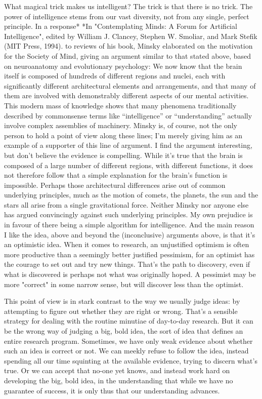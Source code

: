 \documentclass[a4paper,twoside,10pt]{book}
\begin{document}
What magical trick makes us intelligent? The trick is that there is no trick. The power of intelligence stems from our vast diversity, not from any single, perfect principle.
In a response* *In "Contemplating Minds: A Forum for Artificial Intelligence", edited by William J. Clancey, Stephen W. Smoliar, and Mark Stefik (MIT Press, 1994). to reviews of his book, Minsky elaborated on the motivation for the Society of Mind, giving an argument similar to that stated above, based on neuroanatomy and evolutionary psychology:
We now know that the brain itself is composed of hundreds of different regions and nuclei, each with significantly different architectural elements and arrangements, and that many of them are involved with demonstrably different aspects of our mental activities. This modern mass of knowledge shows that many phenomena traditionally described by commonsense terms like ``intelligence'' or ``understanding'' actually involve complex assemblies of machinery.
Minsky is, of course, not the only person to hold a point of view along these lines; I'm merely giving him as an example of a supporter of this line of argument. I find the argument interesting, but don't believe the evidence is compelling. While it's true that the brain is composed of a large number of different regions, with different functions, it does not therefore follow that a simple explanation for the brain's function is impossible. Perhaps those architectural differences arise out of common underlying principles, much as the motion of comets, the planets, the sun and the stars all arise from a single gravitational force. Neither Minsky nor anyone else has argued convincingly against such underlying principles.
My own prejudice is in favour of there being a simple algorithm for intelligence. And the main reason I like the idea, above and beyond the (inconclusive) arguments above, is that it's an optimistic idea. When it comes to research, an unjustified optimism is often more productive than a seemingly better justified pessimism, for an optimist has the courage to set out and try new things. That's the path to discovery, even if what is discovered is perhaps not what was originally hoped. A pessimist may be more "correct" in some narrow sense, but will discover less than the optimist.

This point of view is in stark contrast to the way we usually judge ideas: by attempting to figure out whether they are right or wrong. That's a sensible strategy for dealing with the routine minutiae of day-to-day research. But it can be the wrong way of judging a big, bold idea, the sort of idea that defines an entire research program. Sometimes, we have only weak evidence about whether such an idea is correct or not. We can meekly refuse to follow the idea, instead spending all our time squinting at the available evidence, trying to discern what's true. Or we can accept that no-one yet knows, and instead work hard on developing the big, bold idea, in the understanding that while we have no guarantee of success, it is only thus that our understanding advances.
\end{document}
